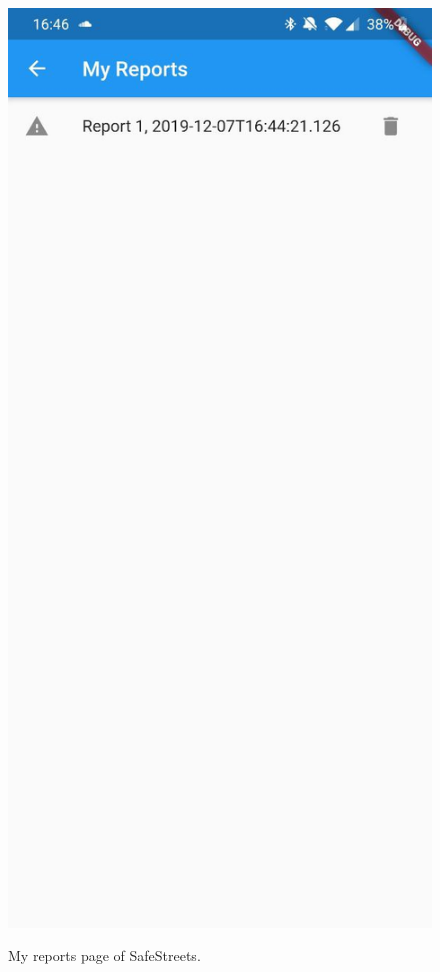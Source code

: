 \documentclass[../RASD.tex]{subfiles}
\begin{document}
    \begin{figure}[H]
        \centering
        \includegraphics[scale = 0.2]{assets/app_screenshots/myrep.jpg}\\[1.6 cm]
        \caption[\textit{My Reports} Screenshot]{My reports page of SafeStreets.}
    \end{figure}
\end{document}
